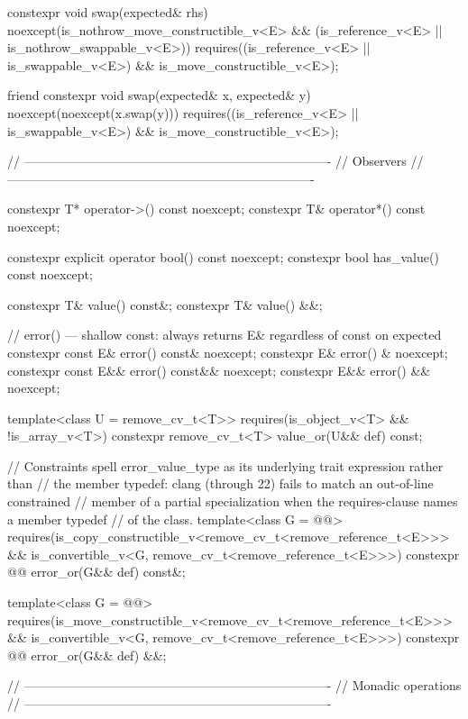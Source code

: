 \begin{codeblock}
{{    constexpr void swap(expected& rhs) noexcept(is_nothrow_move_constructible_v<E> &&
                                                (is_reference_v<E> ||
                                                 is_nothrow_swappable_v<E>))
      requires((is_reference_v<E> || is_swappable_v<E>) && is_move_constructible_v<E>);

    friend constexpr void swap(expected& x, expected& y) noexcept(noexcept(x.swap(y)))
      requires((is_reference_v<E> || is_swappable_v<E>) && is_move_constructible_v<E>);

    // -------------------------------------------------------------------------
    // Observers
    // -------------------------------------------------------------------------

    constexpr T* operator->() const noexcept;
    constexpr T& operator*() const noexcept;

    constexpr explicit operator bool() const noexcept;
    constexpr bool has_value() const noexcept;

    constexpr T& value() const&;
    constexpr T& value() &&;

    // error() — shallow const: always returns E& regardless of const on expected
    constexpr const E& error() const& noexcept;
    constexpr E& error() & noexcept;
    constexpr const E&& error() const&& noexcept;
    constexpr E&& error() && noexcept;

    template<class U = remove_cv_t<T>>
      requires(is_object_v<T> && !is_array_v<T>)
    constexpr remove_cv_t<T> value_or(U&& def) const;

    // Constraints spell error_value_type as its underlying trait expression rather than
    // the member typedef: clang (through 22) fails to match an out-of-line constrained
    // member of a partial specialization when the requires-clause names a member typedef
    // of the class.
    template<class G = @@>
      requires(is_copy_constructible_v<remove_cv_t<remove_reference_t<E>>> &&
               is_convertible_v<G, remove_cv_t<remove_reference_t<E>>>)
    constexpr @@ error_or(G&& def) const&;

    template<class G = @@>
      requires(is_move_constructible_v<remove_cv_t<remove_reference_t<E>>> &&
               is_convertible_v<G, remove_cv_t<remove_reference_t<E>>>)
    constexpr @@ error_or(G&& def) &&;

    // -------------------------------------------------------------------------
    // Monadic operations
    // -------------------------------------------------------------------------

}}
\end{codeblock}
